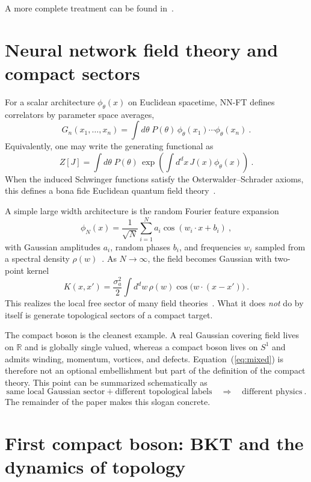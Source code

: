 \documentclass[11pt,a4paper]{article}
\newcommand\be{\begin{equation}}
\newcommand\ee{\end{equation}}
\newcommand\eref[1]{(\ref{#1})}
\begin{document}
A more complete treatment can be found in~\cite{Ferko:2026ken}.

\section{Neural network field theory and compact sectors}

For a scalar architecture $\phi_\theta(x)$ on Euclidean spacetime, NN-FT defines correlators by parameter space averages,
\be
G_n(x_1,\ldots,x_n)=\int d\theta\;P(\theta)\,\phi_\theta(x_1)\cdots\phi_\theta(x_n)~.
\label{eq:gn}
\ee
Equivalently, one may write the generating functional as
\be
Z[J]=\int d\theta\;P(\theta)\,\exp\!\left(\int d^dx\,J(x)\phi_\theta(x)\right)~.
\label{eq:ZJ}
\ee
When the induced Schwinger functions satisfy the Osterwalder--Schrader axioms, this defines a bona fide Euclidean quantum field theory~\cite{Osterwalder:1973dx,Osterwalder:1974tc,Halverson:2021aot}.

A simple large width architecture is the random Fourier feature expansion
\be
\phi_N(x)=\frac{1}{\sqrt N}\sum_{i=1}^N a_i\cos(w_i\!\cdot\! x+b_i)~,
\label{eq:rff}
\ee
with Gaussian amplitudes $a_i$, random phases $b_i$, and frequencies $w_i$ sampled from a spectral density $\rho(w)$~\cite{rahimi2007random}. As $N\to\infty$, the field becomes Gaussian with two-point kernel
\be
K(x,x')=\frac{\sigma_a^2}{2}\int d^dw\,\rho(w)\cos\big(w\!\cdot\!(x-x')\big)~.
\label{eq:kernel}
\ee
This realizes the local free sector of many field theories~\cite{Halverson:2020trp,Halverson:2021aot,Frank:2026bui}. What it does \emph{not} do by itself is generate topological sectors of a compact target.

The compact boson is the cleanest example. A real Gaussian covering field lives on $\mathbb R$ and is globally single valued, whereas a compact boson lives on $S^1$ and admits winding, momentum, vortices, and defects. Equation~\eref{eq:mixed} is therefore not an optional embellishment but part of the definition of the compact theory. This point can be summarized schematically as
\be
\text{same local Gaussian sector} + \text{different topological labels}
\quad \Longrightarrow \quad \text{different physics}~.
\label{eq:slogan}
\ee
The remainder of the paper makes this slogan concrete.

\section{First compact boson: BKT and the dynamics of topology}
\end{document}
